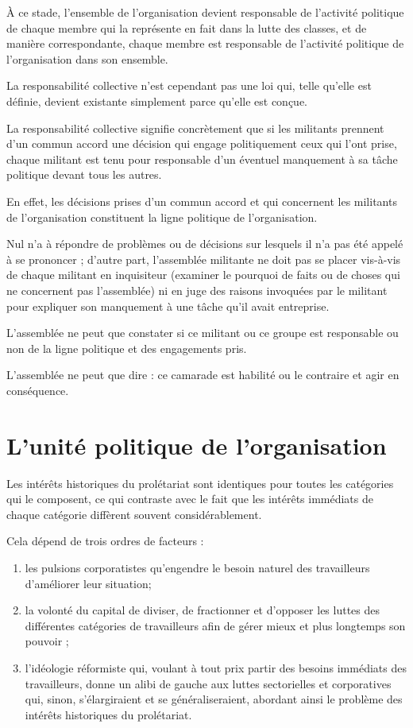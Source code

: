 À ce stade, l'ensemble de l'organisation devient responsable de l'activité politique de chaque membre qui la représente en fait dans la lutte des classes, et de manière correspondante, chaque membre est responsable de l'activité politique de l'organisation dans son ensemble.

La responsabilité collective n'est cependant pas une loi qui, telle qu'elle est définie, devient existante simplement parce qu'elle est conçue.

La responsabilité collective signifie concrètement que si les militants prennent d'un commun accord une décision qui engage politiquement ceux qui l'ont prise, chaque militant est tenu pour responsable d'un éventuel manquement à sa tâche politique devant tous les autres.

En effet, les décisions prises d'un commun accord et qui concernent les militants de l'organisation constituent la ligne politique de l'organisation.

Nul n'a à répondre de problèmes ou de décisions sur lesquels il n'a pas été appelé à se prononcer ; d'autre part, l'assemblée militante ne doit pas se placer vis-à-vis de chaque militant en inquisiteur (examiner le pourquoi de faits ou de choses qui ne concernent pas l'assemblée) ni en juge des raisons invoquées par le militant pour expliquer son manquement à une tâche qu'il avait entreprise.

L'assemblée ne peut que constater si ce militant ou ce groupe est responsable ou non de la ligne politique et des engagements pris.

L'assemblée ne peut que dire : ce camarade est habilité ou le contraire et agir en conséquence.

\section{L'unité politique de l'organisation}\hypertarget{lunit-politique-de-lorganisation}{}\label{lunit-politique-de-lorganisation}

Les intérêts historiques du prolétariat sont identiques pour toutes les catégories qui le composent, ce qui contraste avec le fait que les intérêts immédiats de chaque catégorie diffèrent souvent considérablement.

Cela dépend de trois ordres de facteurs :

\begin{enumerate}
\item{} les pulsions corporatistes qu'engendre le besoin naturel des travailleurs d’améliorer leur situation;
\item{} la volonté du capital de diviser, de fractionner et d'opposer les luttes des différentes catégories de travailleurs afin de gérer mieux et plus longtemps son pouvoir ;
\item{} l'idéologie réformiste qui, voulant à tout prix partir des besoins immédiats des travailleurs, donne un alibi de gauche aux luttes sectorielles et corporatives qui, sinon, s'élargiraient et se généraliseraient, abordant ainsi le problème des intérêts historiques du prolétariat.
\end{enumerate}

